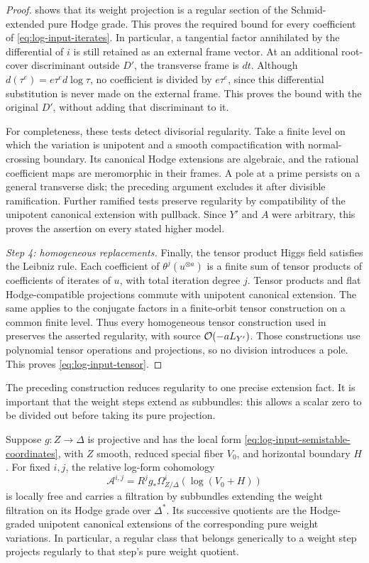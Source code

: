 \begin{proof}
 shows that its weight projection is
a regular section of the Schmid-extended pure Hodge grade.
This proves the required bound for every coefficient of
\eqref{eq:log-input-iterates}.  In particular, a tangential
factor annihilated by the differential of $i$ is still retained
as an external frame vector.  At an additional root-cover
discriminant outside $D'$, the transverse frame is $dt$.
Although $d(\tau^e)=e\tau^e d\log\tau$, no coefficient is
divided by $e\tau^e$, since this differential substitution is
never made on the external frame.  This proves the bound with
the original $D'$, without adding that discriminant to it.

For completeness, these tests detect divisorial regularity.
Take a finite level on which the variation is unipotent and a
smooth compactification with normal-crossing boundary.  Its
canonical Hodge extensions are algebraic, and the rational
coefficient maps are meromorphic in their frames.  A pole at
a prime persists on a general transverse disk; the preceding
argument excludes it after divisible ramification.  Further
ramified tests preserve regularity by compatibility of the
unipotent canonical extension with pullback.  Since $Y'$ and
$A$ were arbitrary, this proves the assertion on every stated
higher model.

\smallskip\noindent\emph{Step 4: homogeneous replacements.}
Finally, the tensor product Higgs field satisfies the Leibniz
rule.  Each coefficient of $\theta^j(u^{\otimes a})$ is a finite
sum of tensor products of coefficients of iterates of $u$,
with total iteration degree $j$.  Tensor products and flat
Hodge-compatible projections commute with unipotent canonical
extension.  The same applies to the conjugate factors in a
finite-orbit tensor construction on a common finite level.
Thus every homogeneous tensor construction used in
 preserves the asserted regularity,
with source $\mathcal O(-aL_{Y'})$.  Those constructions use polynomial
tensor operations and projections, so no division introduces
a pole.  This proves \eqref{eq:log-input-tensor}.
\end{proof}

The preceding construction reduces regularity to one precise extension
fact. It is important that the weight steps extend as subbundles: this
allows a scalar zero to be divided out before taking its pure projection.

\begin{lemma}\label{lem:weight-extension}
Suppose $g:Z\to\Delta$ is projective and has the local form
\eqref{eq:log-input-semistable-coordinates}, with $Z$ smooth,
reduced special fiber $V_0$, and horizontal boundary $H$.
For fixed $i,j$, the relative log-form cohomology
\[
 \mathcal A^{i,j}=R^j g_*\Omega^i_{Z/\Delta}(\log(V_0+H))
\]
is locally free and carries a filtration by subbundles extending
the weight filtration on its Hodge grade over $\Delta^*$.
Its successive quotients are the Hodge-graded unipotent
canonical extensions of the corresponding pure weight
variations.  In particular, a regular class that belongs
generically to a weight step projects regularly to that
step's pure weight quotient.
\end{lemma}

